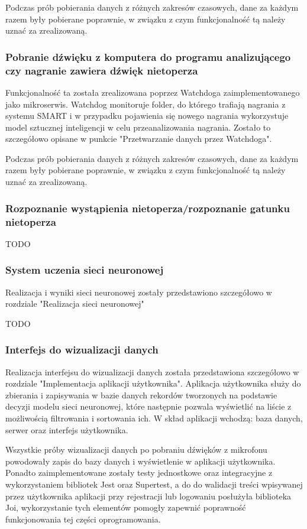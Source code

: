 \documentclass{sprz}
\begin{document}
Podczas prób pobierania danych z różnych zakresów czasowych, dane za każdym razem były pobierane poprawnie, w związku z czym funkcjonalność tą należy uznać za zrealizowaną.

\subsubsection{Pobranie dźwięku z komputera do programu analizującego czy nagranie zawiera dźwięk nietoperza}
Funkcjonalność ta została zrealizowana poprzez Watchdoga zaimplementowanego jako mikroserwis. Watchdog monitoruje folder, do którego trafiają nagrania z systemu SMART i w przypadku pojawienia się nowego nagrania wykorzystuje model sztucznej inteligencji w celu przeanalizowania nagrania. Zostało to szczegółowo opisane w punkcie "Przetwarzanie danych przez Watchdoga". 


Podczas prób pobierania danych z różnych zakresów czasowych, dane za każdym razem były pobierane poprawnie, w związku z czym funkcjonalność tą należy uznać za zrealizowaną.

\subsubsection{Rozpoznanie wystąpienia nietoperza/rozpoznanie gatunku nietoperza}
TODO


\subsubsection{System uczenia sieci neuronowej}
Realizacja i wyniki sieci neuronowej zostały przedstawiono szczegółowo w rozdziale "Realizacja sieci neuronowej"


TODO

\subsubsection{Interfejs do wizualizacji danych}
Realizacja interfejsu do wizualizacji danych została przedstawiona szczegółowo w rozdziale "Implementacja aplikacji użytkownika". Aplikacja użytkownika służy do zbierania i zapisywania w bazie danych rekordów tworzonych na podstawie decyzji modelu sieci neuronowej, które następnie pozwala wyświetlić na liście z możliwością filtrowania i sortowania ich. W skład aplikacji wchodzą: baza danych, serwer oraz interfejs użytkownika. 


Wszystkie próby wizualizacji danych po pobraniu dźwięków z mikrofonu powodowały zapis do bazy danych i wyświetlenie w aplikacji użytkownika. Ponadto zaimplementowane zostały testy jednostkowe oraz integracyjne z wykorzystaniem bibliotek Jest oraz Supertest, a do do walidacji treści wpisywanej przez użytkownika aplikacji przy rejestracji lub logowaniu posłużyła biblioteka Joi, wykorzystanie tych elementów pomogły zapewnić poprawność funkcjonowania tej części oprogramowania.
\end{document}
